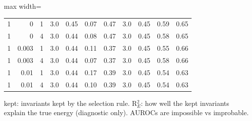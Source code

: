 \begin{table}[t]
\begin{adjustbox}{max width=\linewidth}
\begin{tabular}{rrr|cccc|cccc}
1 & 0 & 1 & 3.0 & 0.45 & 0.07 & 0.47 & 3.0 & 0.45 & 0.59 & 0.65\\
1 & 0 & 4 & 3.0 & 0.44 & 0.08 & 0.47 & 3.0 & 0.45 & 0.58 & 0.65\\
1 & 0.003 & 1 & 3.0 & 0.44 & 0.11 & 0.37 & 3.0 & 0.45 & 0.55 & 0.66\\
1 & 0.003 & 4 & 3.0 & 0.44 & 0.07 & 0.37 & 3.0 & 0.45 & 0.58 & 0.66\\
1 & 0.01 & 1 & 3.0 & 0.44 & 0.17 & 0.39 & 3.0 & 0.45 & 0.54 & 0.63\\
1 & 0.01 & 4 & 3.0 & 0.44 & 0.10 & 0.39 & 3.0 & 0.45 & 0.54 & 0.63\\
\bottomrule\end{tabular}\end{adjustbox}
\par\smallskip\footnotesize kept: invariants kept by the selection rule. R$^2_E$: how well the kept invariants explain the true energy (diagnostic only). AUROCs are impossible vs improbable.
\end{table}
